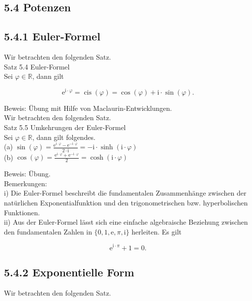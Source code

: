 \documentclass[10pt]{article}
\begin{document}
\subsection*{5.4 Potenzen}
\subsection*{5.4.1 Euler-Formel}
Wir betrachten den folgenden Satz.\\
Satz 5.4 Euler-Formel\\
Sei $\varphi \in \mathbb{R}$, dann gilt


\begin{equation*}
\mathrm{e}^{\mathrm{i} \cdot \varphi}=\operatorname{cis}(\varphi)=\cos (\varphi)+\mathrm{i} \cdot \sin (\varphi) . \tag{5.28}
\end{equation*}


Beweis: Übung mit Hilfe von Maclaurin-Entwicklungen.\\
Wir betrachten den folgenden Satz.\\
Satz 5.5 Umkehrungen der Euler-Formel\\
Sei $\varphi \in \mathbb{R}$, dann gilt folgendes.\\
(a) $\sin (\varphi)=\frac{\mathrm{e}^{\mathrm{i} \cdot \varphi}-\mathrm{e}^{-\mathrm{i} \cdot \varphi}}{2 \cdot \mathrm{i}}=-\mathrm{i} \cdot \sinh (\mathrm{i} \cdot \varphi)$\\
(b) $\cos (\varphi)=\frac{\mathrm{e}^{\mathrm{i} \cdot \varphi}+\mathrm{e}^{-\mathrm{i} \cdot \varphi}}{2}=\cosh (\mathrm{i} \cdot \varphi)$

Beweis: Übung.\\
Bemerkungen:\\
i) Die Euler-Formel beschreibt die fundamentalen Zusammenhänge zwischen der natürlichen Exponentialfunktion und den trigonometrischen bzw. hyperbolischen Funktionen.\\
ii) Aus der Euler-Formel lässt sich eine einfache algebraische Beziehung zwischen den fundamentalen Zahlen in $\{0,1, \mathrm{e}, \pi, \mathrm{i}\}$ herleiten. Es gilt


\begin{equation*}
\mathrm{e}^{\mathrm{i} \cdot \pi}+1=0 . \tag{5.29}
\end{equation*}


\subsection*{5.4.2 Exponentielle Form}
Wir betrachten den folgenden Satz.
\end{document}
